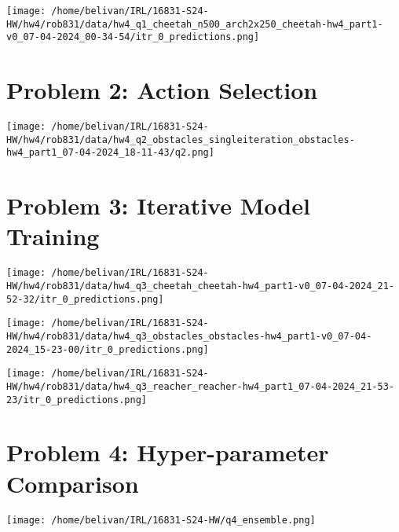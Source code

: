 \documentclass{article}
\begin{document}
\begin{answer}[title=Performance Plot Cheetah Env (3),height=9.5cm,width=\linewidth]
\centering
\texttt{[image: /home/belivan/IRL/16831-S24-HW/hw4/rob831/data/hw4\_q1\_cheetah\_n500\_arch2x250\_cheetah-hw4\_part1-v0\_07-04-2024\_00-34-54/itr\_0\_predictions.png]}
\end{answer}

\section{Problem 2: Action Selection}
\begin{answer}[title=Reward Return Plot Obstacles Env,height=9.5cm,width=\linewidth]
\centering
\texttt{[image: /home/belivan/IRL/16831-S24-HW/hw4/rob831/data/hw4\_q2\_obstacles\_singleiteration\_obstacles-hw4\_part1\_07-04-2024\_18-11-43/q2.png]}
\end{answer}



\section{Problem 3: Iterative Model Training}
\begin{answer}[title=Performance Plot Cheetah Env,height=9.5cm,width=\linewidth]
\centering
\texttt{[image: /home/belivan/IRL/16831-S24-HW/hw4/rob831/data/hw4\_q3\_cheetah\_cheetah-hw4\_part1-v0\_07-04-2024\_21-52-32/itr\_0\_predictions.png]}
\end{answer}

\begin{answer}[title=Performance Plot Obstacles Env,height=9.5cm,width=\linewidth]
\centering
\texttt{[image: /home/belivan/IRL/16831-S24-HW/hw4/rob831/data/hw4\_q3\_obstacles\_obstacles-hw4\_part1-v0\_07-04-2024\_15-23-00/itr\_0\_predictions.png]}
\end{answer}

\begin{answer}[title=Performance Plot Reacher Env,height=9.5cm,width=\linewidth]
\centering
\texttt{[image: /home/belivan/IRL/16831-S24-HW/hw4/rob831/data/hw4\_q3\_reacher\_reacher-hw4\_part1\_07-04-2024\_21-53-23/itr\_0\_predictions.png]}
\end{answer}

\section{Problem 4: Hyper-parameter Comparison}
\begin{answer}[title=Plot,height=9.5cm,width=\linewidth]
\centering
\texttt{[image: /home/belivan/IRL/16831-S24-HW/q4\_ensemble.png]}
\end{answer}
\end{document}
